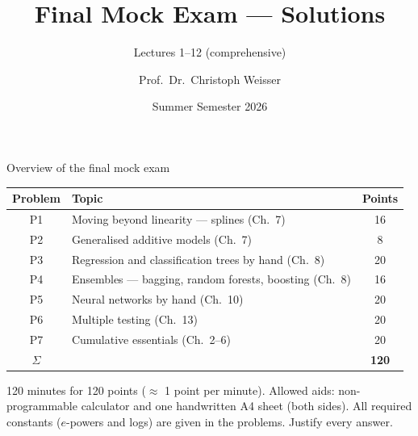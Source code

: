 \documentclass[aspectratio=169,11pt]{beamer}
\title{Final Mock Exam --- Solutions}
\subtitle{Lectures 1--12 (comprehensive)}
\author{Prof.\ Dr.\ Christoph Weisser}\institute{Quantitative Research Methods \textperiodcentered\ HSBI}
\date{Summer Semester 2026}\graphicspath{{images/}}
\begin{document}
\begin{frame}[plain]\titlepage\end{frame}

\begin{frame}{Overview of the final mock exam}
  \footnotesize
  \begin{center}
  \begin{tabular}{@{}clc@{}}
    \toprule
    \textbf{Problem} & \textbf{Topic} & \textbf{Points}\\
    \midrule
    P1 & Moving beyond linearity --- splines (Ch.\ 7) & 16\\
    P2 & Generalised additive models (Ch.\ 7) & 8\\
    P3 & Regression and classification trees by hand (Ch.\ 8) & 20\\
    P4 & Ensembles --- bagging, random forests, boosting (Ch.\ 8) & 16\\
    P5 & Neural networks by hand (Ch.\ 10) & 20\\
    P6 & Multiple testing (Ch.\ 13) & 20\\
    P7 & Cumulative essentials (Ch.\ 2--6) & 20\\
    \midrule
    $\Sigma$ & & \textbf{120}\\
    \bottomrule
  \end{tabular}
  \end{center}
  \vspace{2pt}
  \begin{takeaway}
    120 minutes for 120 points ($\approx$ 1 point per minute). Allowed aids: non-programmable
    calculator and one handwritten A4 sheet (both sides). All required constants ($e$-powers
    and logs) are given in the problems. Justify every answer.
  \end{takeaway}
\end{frame}
\end{document}
